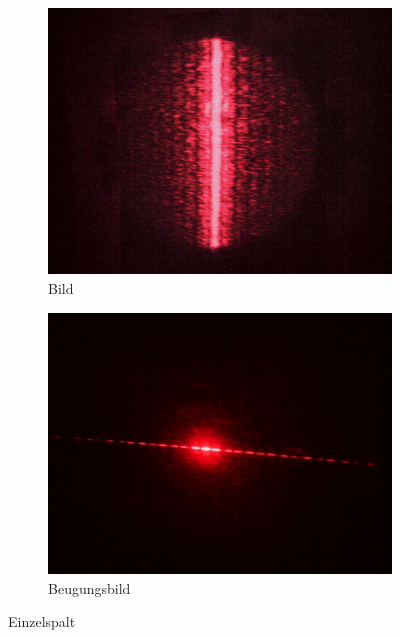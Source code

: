 \begin{figure}[p]
	\centering
	\begin{subfigure}[b]{0.49\textwidth}
		\includegraphics[width=\textwidth]{data/optics/02_Einzelspalt_Bild}
		\caption{Bild}
	\end{subfigure}
	\begin{subfigure}[b]{0.49\textwidth}
		\includegraphics[width=\textwidth]{data/optics/02_Einzelspalt_Beugung}
		\caption{Beugungsbild} 		\label{fig:Einzel_BG}
	\end{subfigure}
	\caption{Einzelspalt}				\label{fig:Einzel}
	\vspace{-1em}
\end{figure}

